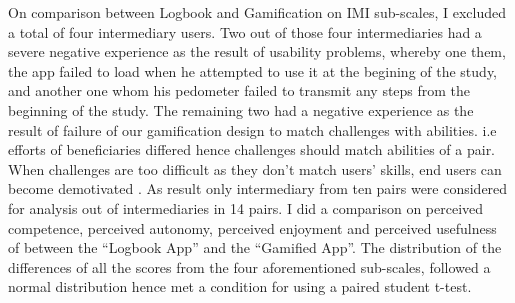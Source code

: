 On comparison between Logbook and Gamification on IMI sub-scales, I excluded a total of four intermediary users. Two out of those four intermediaries had a severe negative experience as the result of usability problems, whereby one them, the app failed to load when he attempted to use it at the begining of the study, and another one whom his pedometer failed to transmit any steps from the beginning of the study. The remaining two had a negative experience as the result of failure of our gamification design to match challenges with abilities. i.e efforts of beneficiaries differed hence challenges should match abilities of a pair. When challenges are too difficult as they don't match users' skills, end users can become demotivated \citep{zhang2008motivational}. As result only intermediary from ten pairs were considered for analysis out of intermediaries in 14 pairs. I did a comparison on perceived competence, perceived autonomy, perceived enjoyment and perceived usefulness of between the ``Logbook App''  and the ``Gamified App''. The distribution of the differences of all the scores from the four aforementioned sub-scales, followed a normal distribution hence met a condition for using a paired student t-test. 

 
\begin{flushright}

\end{flushright}
